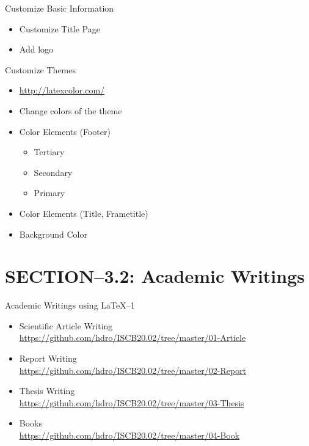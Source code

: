 \begin{frame}[t]{Customize Basic Information}
	\begin{itemize}
		\item Customize Title Page
		\item Add logo
	\end{itemize}
\end{frame}

\begin{frame}[t]{Customize Themes}
	\begin{itemize}
		\item\url{http://latexcolor.com/}
		\item Change colors of the theme
		\item Color Elements (Footer)
		\begin{itemize}
			\item Tertiary
			\item Secondary
			\item Primary
		\end{itemize}
	\item Color Elements (Title, Frametitle)
	\item Background Color
	\end{itemize}
\end{frame}


\section{SECTION--3.2: Academic Writings}
\begin{frame}[t]{Academic Writings using \LaTeX --1}
	\begin{itemize}
		\item Scientific Article Writing \\ 
		\url{https://github.com/hdro/ISCB20.02/tree/master/01-Article}
		
		\item Report Writing \\ 
		\url{https://github.com/hdro/ISCB20.02/tree/master/02-Report}
		\item Thesis Writing \\ 
		\url{https://github.com/hdro/ISCB20.02/tree/master/03-Thesis}
		\item Books \\ 
		\url{https://github.com/hdro/ISCB20.02/tree/master/04-Book}
	\end{itemize}
\end{frame}



